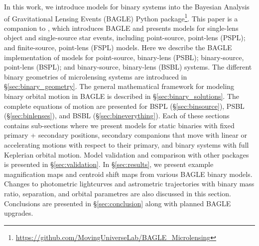 \documentclass[twocolumn]{aastex701}
\begin{document}

In this work, we introduce models for binary systems into the Bayesian Analysis of Gravitational Lensing Events (BAGLE) Python package\footnote{\url{https://github.com/MovingUniverseLab/BAGLE_Microlensing}}. This paper is a companion to \citep{Lu:2025}, which introduces BAGLE and presents models for single-lens object and single-source star events, including point-source, point-lens (PSPL); and finite-source, point-lens (FSPL) models. 
Here we describe the BAGLE implementation of models for point-source, binary-lens (PSBL); binary-source, point-lens (BSPL); and binary-source, binary-lens (BSBL) systems. 
The different binary geometries of microlensing systems are introduced in \S\ref{sec:binary_geometry}.
The general mathematical framework for modeling binary orbital motion in BAGLE is described in \S\ref{sec:binary_solutions}. 
The complete equations of motion are presented for BSPL (\S\ref{sec:binsource}), PSBL (\S\ref{sec:binlenses}), and BSBL  (\S\ref{sec:bineverything}). 
Each of these sections contains sub-sections where we present models for static binaries with fixed primary + secondary positions, secondary companions that move with linear or accelerating motions with respect to their primary, and binary systems with full Keplerian orbital motion. 
Model validation and comparison with other packages is presented in \S\ref{sec:validation}. 
In \S\ref{sec:results}, we present example magnification maps and centroid shift maps from various BAGLE binary models. Changes to photometric lightcurves and astrometric trajectories with binary mass ratio, separation, and orbital parametres are also discussed in this section. 
Conclusions are presented in \S\ref{sec:conclusion} along with planned BAGLE upgrades.

\end{document}

